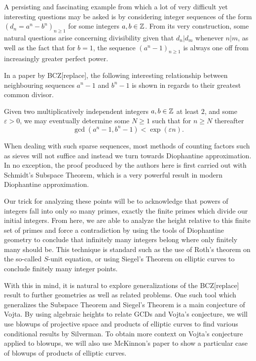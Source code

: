 \documentclass[12pt]{article}
\begin{document}
A persisting and fascinating example from which a lot of very difficult yet interesting questions may be asked is by considering integer sequences of the form $(d_n = a^n - b^n)_{n \geq 1}$ for some integers $a, b \in \mathbb{Z}$.
From its very construction, some natural questions arise concerning divisibility given that $d_n | d_m$ whenever $n | m$,
as well as the fact that for $b = 1$, the sequence $(a^n - 1)_{n \geq 1}$ is always one off from increasingly greater perfect power.


In a paper by BCZ[replace], the following interesting relationship between neighbouring sequences $a^n - 1$ and $b^n - 1$ is shown in regards to their greatest common divisor.

\begin{theorem}
    Given two multiplicatively independent integers $a, b \in \mathbb{Z}$ at least $2$, and some $\varepsilon > 0$,
    we may eventually determine some $N \geq 1$ such that for $n \geq N$ thereafter
    \[
        \gcd(a^n - 1, b^n - 1) < \exp(\varepsilon n).
    \]
\end{theorem}

When dealing with such sparse sequences,
most methods of counting factors such as sieves will not suffice and instead we turn towards Diophantine approximation.
In no exception, the proof produced by the authors here is first carried out with Schmidt's Subspace Theorem, 
which is a very powerful result in modern Diophantine approximation.

Our trick for analyzing these points will be to acknowledge that powers of integers fall into only so many primes,
exactly the finite primes which divide our initial integers.
From here, we are able to analyze the height relative to this finite set of primes and force a contradiction by using the tools of Diophantine geometry to conclude that infinitely many integers belong where only finitely many should be.
This technique is standard such as the use of Roth's theorem on the so-called $S$-unit equation,
or using Siegel's Theorem on elliptic curves to conclude finitely many integer points.

With this in mind, it is natural to explore generalizations of the BCZ[replace] result to further geometries as well as related problems.
One such tool which generalizes the Subspace Theorem and Siegel's Theorem is a main conjecture of Vojta.
By using algebraic heights to relate GCDs and Vojta's conjecture, 
we will use blowups of projective space and products of elliptic curves to find various conditional results by Silverman.
To obtain more context on Vojta's conjecture applied to blowups,
we will also use McKinnon's paper to show a particular case of blowups of products of elliptic curves.
\end{document}
